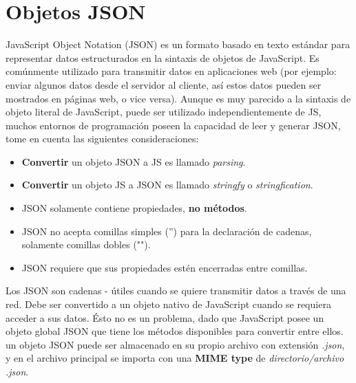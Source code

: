 \section{Objetos JSON}
\hspace{0.55cm}JavaScript Object Notation (JSON) es un formato basado en texto estándar para representar datos estructurados en la sintaxis de objetos de JavaScript. Es comúnmente utilizado para transmitir datos en aplicaciones web (por ejemplo: enviar algunos datos desde el servidor al cliente, así estos datos pueden ser mostrados en páginas web, o vice versa). Aunque es muy parecido a la sintaxis de objeto literal de JavaScript, puede ser utilizado independientemente de JS, muchos entornos de programación poseen la capacidad de leer y generar JSON, tome en cuenta las siguientes consideraciones:
\begin{itemize}
    \item \textbf{Convertir} un objeto JSON a JS es llamado \textit{parsing}.
    \item \textbf{Convertir} un objeto JS  a JSON es llamado \textit{stringfy} o \textit{stringfication}.
    \item JSON solamente contiene propiedades, \textbf{no métodos}.
    \item JSON no acepta comillas simples ('') para la declaración de cadenas, solamente comillas dobles ("").
    \item JSON requiere que sus propiedades estén encerradas entre comillas.
\end{itemize}

Los JSON son cadenas - útiles cuando se quiere transmitir datos a través de una red. Debe ser convertido a un objeto nativo de JavaScript cuando se requiera acceder a sus datos. Ésto no es un problema, dado que JavaScript posee un objeto global JSON que tiene los métodos disponibles para convertir entre ellos. un objeto JSON puede ser almacenado en su propio archivo con extensión \textit{.json}, y en el archivo principal se importa con una \textbf{MIME type} de \textit{directorio/archivo .json}.


